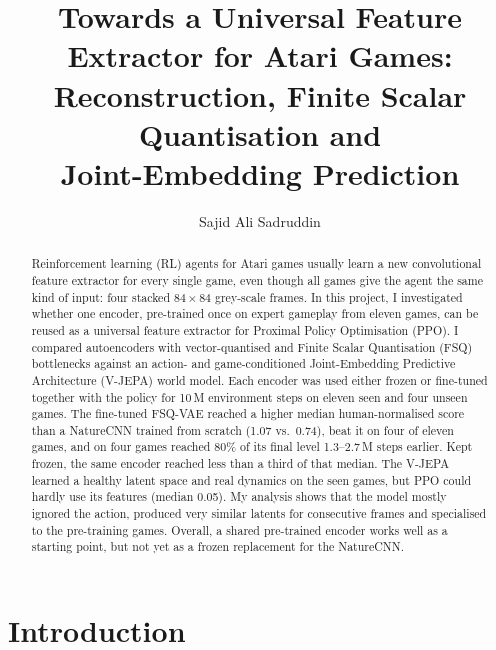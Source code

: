 \documentclass[runningheads]{llncs}
\begin{document}
\title{Towards a Universal Feature Extractor for Atari Games:\\
Reconstruction, Finite Scalar Quantisation and\\ Joint-Embedding Prediction}

\author{Sajid Ali Sadruddin}

\maketitle

\begin{abstract}
Reinforcement learning (RL) agents for Atari games usually learn a new convolutional
feature extractor for every single game, even though all games give the agent the same kind
of input: four stacked $84\times84$ grey-scale frames. In this project, I investigated whether
one encoder, pre-trained once on expert gameplay from eleven games, can be reused as a
universal feature extractor for Proximal Policy Optimisation (PPO). I compared autoencoders
with vector-quantised and Finite Scalar Quantisation (FSQ) bottlenecks against an action- and
game-conditioned Joint-Embedding Predictive Architecture (V-JEPA) world model. Each encoder was
used either frozen or fine-tuned together with the policy for 10\,M environment steps on
eleven seen and four unseen games. The fine-tuned FSQ-VAE reached a higher median
human-normalised score than a NatureCNN trained from scratch (1.07 vs.\ 0.74), beat it on four
of eleven games, and on four games reached 80\% of its final level 1.3--2.7\,M steps earlier.
Kept frozen, the same encoder reached less than a third of that median. The V-JEPA learned a
healthy latent space and real dynamics on the seen games, but PPO could hardly use its
features (median 0.05). My analysis shows that the model mostly ignored the action, produced
very similar latents for consecutive frames and specialised to the pre-training games. Overall,
a shared pre-trained encoder works well as a starting point, but not yet as a frozen
replacement for the NatureCNN.
\end{abstract}

\section{Introduction}
\label{sec:intro}
\end{document}
